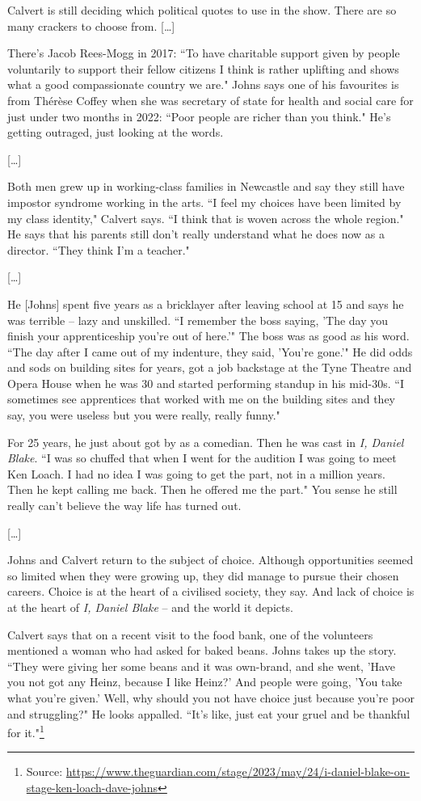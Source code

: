 \documentclass[10pt,a4paper]{article}
\newcommand{\qm}[1]{``#1"}
\newcommand{\source}[1]{\footnote{Source: \href{#1}{#1}}}
\begin{document}
Calvert is still deciding which political quotes to use in the show. There are so many crackers to choose from. [\ldots]

There's Jacob Rees-Mogg in 2017: \qm{To have charitable support given by people voluntarily to support their fellow citizens I think is rather uplifting and shows what a good compassionate country we are.} Johns says one of his favourites is from Thérèse Coffey when she was secretary of state for health and social care for just under two months in 2022: \qm{Poor people are richer than you think.} He's getting outraged, just looking at the words.

[\ldots]

Both men grew up in working-class families in Newcastle and say they still have impostor syndrome working in the arts. \qm{I feel my choices have been limited by my class identity,} Calvert says. \qm{I think that is woven across the whole region.} He says that his parents still don't really understand what he does now as a director. \qm{They think I'm a teacher.}

[\ldots]

He [Johns] spent five years as a bricklayer after leaving school at 15 and says he was terrible -- lazy and unskilled. \qm{I remember the boss saying, 'The day you finish your apprenticeship you're out of here.'} The boss was as good as his word. \qm{The day after I came out of my indenture, they said, 'You're gone.'} He did odds and sods on building sites for years, got a job backstage at the Tyne Theatre and Opera House when he was 30 and started performing standup in his mid-30s. \qm{I sometimes see apprentices that worked with me on the building sites and they say, you were useless but you were really, really funny.}

For 25 years, he just about got by as a comedian. Then he was cast in \textit{I, Daniel Blake}. \qm{I was so chuffed that when I went for the audition I was going to meet Ken Loach. I had no idea I was going to get the part, not in a million years. Then he kept calling me back. Then he offered me the part.} You sense he still really can't believe the way life has turned out.

[\ldots]

Johns and Calvert return to the subject of choice. Although opportunities seemed so limited when they were growing up, they did manage to pursue their chosen careers. Choice is at the heart of a civilised society, they say. And lack of choice is at the heart of \textit{I, Daniel Blake} -- and the world it depicts.

Calvert says that on a recent visit to the food bank, one of the volunteers mentioned a woman who had asked for baked beans. Johns takes up the story. \qm{They were giving her some beans and it was own-brand, and she went, 'Have you not got any Heinz, because I like Heinz?' And people were going, 'You take what you're given.' Well, why should you not have choice just because you're poor and struggling?} He looks appalled. \qm{It's like, just eat your gruel and be thankful for it.}\source{https://www.theguardian.com/stage/2023/may/24/i-daniel-blake-on-stage-ken-loach-dave-johns}
\end{document}
